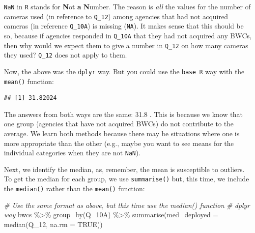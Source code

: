 \documentclass[
]{book}
\newenvironment{Shaded}{\begin{snugshade}}{\end{snugshade}}
\newcommand{\AttributeTok}[1]{\textcolor[rgb]{0.77,0.63,0.00}{#1}}
\newcommand{\CommentTok}[1]{\textcolor[rgb]{0.56,0.35,0.01}{\textit{#1}}}
\newcommand{\ConstantTok}[1]{\textcolor[rgb]{0.00,0.00,0.00}{#1}}
\newcommand{\FunctionTok}[1]{\textcolor[rgb]{0.00,0.00,0.00}{#1}}
\newcommand{\NormalTok}[1]{#1}
\newcommand{\SpecialCharTok}[1]{\textcolor[rgb]{0.00,0.00,0.00}{#1}}
\begin{document}
\texttt{NaN} in \texttt{R} stands for \textbf{N}ot \textbf{a} \textbf{N}umber. The reason is \emph{all} the values for the number of cameras used (in reference to \texttt{Q\_12}) among agencies that had not acquired cameras (in reference \texttt{Q\_10A}) is missing (\texttt{NA}). It makes sense that this should be so, because if agencies responded in \texttt{Q\_10A} that they had not acquired any BWCs, then why would we expect them to give a number in \texttt{Q\_12} on how many cameras they used? \texttt{Q\_12} does not apply to them.

Now, the above was the \texttt{dplyr} way. But you could use the \texttt{base\ R} way with the \texttt{mean()} function:

\begin{Shaded}
\end{Shaded}

\begin{verbatim}
## [1] 31.82024
\end{verbatim}

The answers from both ways are the same: 31.8 . This is because we know that one group (agencies that have not acquired BWCs) do not contribute to the average. We learn both methods because there may be situations where one is more appropriate than the other (e.g., maybe you want to see means for the individual categories when they are not \texttt{NaN}).

Next, we identify the median, as, remember, the mean is susceptible to outliers. To get the median for each group, we use \texttt{summarise()} but, this time, we include the \texttt{median()} rather than the \texttt{mean()} function:

\begin{Shaded}
\begin{Highlighting}[]
\CommentTok{\# Use the same format as above, but this time use the median() function }
\CommentTok{\# dplyr way }
\NormalTok{bwcs }\SpecialCharTok{\%\textgreater{}\%} \FunctionTok{group\_by}\NormalTok{(Q\_10A) }\SpecialCharTok{\%\textgreater{}\%} \FunctionTok{summarise}\NormalTok{(}\AttributeTok{med\_deployed =} \FunctionTok{median}\NormalTok{(Q\_12, }\AttributeTok{na.rm =} \ConstantTok{TRUE}\NormalTok{))}
\end{Highlighting}
\end{Shaded}
\end{document}
